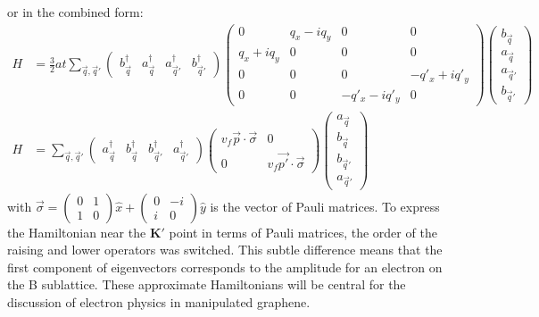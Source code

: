 or in the combined form:
\begin{align}
	H&=\frac{3}{2} a t \sum_{\vec q, \vec{q}'}
		\left( \begin{array}{cccc} b^{\dagger}_{\vec{q}} & a^{\dagger}_{\vec{q}} & a^{\dagger}_{\vec{q}'} & b^{\dagger}_{\vec{q}'}
																							\end{array} \right)
		\left( \begin{array}{cccc}
			0              & q_x - i q_y & 0            & 0 \\
			q_x+i q_y      & 0           & 0            & 0 \\                            
			0              & 0           & 0            & -q'_x+i q'_y \\
			0              & 0           & -q'_x-i q'_y & 0			            			\end{array} \right)
		\left( \begin{array}{c } b_{\vec{q}} \\ a_{\vec{q}} \\ a_{\vec{q}'} \\ b_{\vec{q}'}  \end{array} \right) \\
	H&=\sum_{\vec q, \vec{q}'}
		\left( \begin{array}{cccc}  a^{\dagger}_{\vec{q}} & b^{\dagger}_{\vec{q}}&  b^{\dagger}_{\vec{q}'} & a^{\dagger}_{\vec{q}'}
																							\end{array} \right)
		\left( \begin{array}{cc}
			v_f \vec{p} \cdot \vec{\sigma}              & 0\\
			0              & v_f \vec{p'} \cdot \vec{\sigma}			   	            			\end{array} \right)
		\left( \begin{array}{c }  a_{\vec{q}} \\ b_{\vec{q}} \\  b_{\vec{q}'} \\ a_{\vec{q}'} \end{array} \right)
	\label{eq:TB:FullH}
\end{align}
with $\vec{\sigma}= \left( \begin{array}{cc} 0 & 1 \\ 1 & 0 \end{array} \right) \hat{x}+\left( \begin{array}{cc} 0 & -i \\ i & 0 \end{array} \right) \hat{y}$ is the vector of Pauli matrices.
To express the Hamiltonian near the $\bm{K'}$ point in terms of Pauli matrices, the order of the raising and lower operators was switched.
This subtle difference means that the first component of eigenvectors corresponds to the amplitude for an electron on the B sublattice.
These approximate Hamiltonians will be central for the discussion of electron physics in manipulated graphene.

